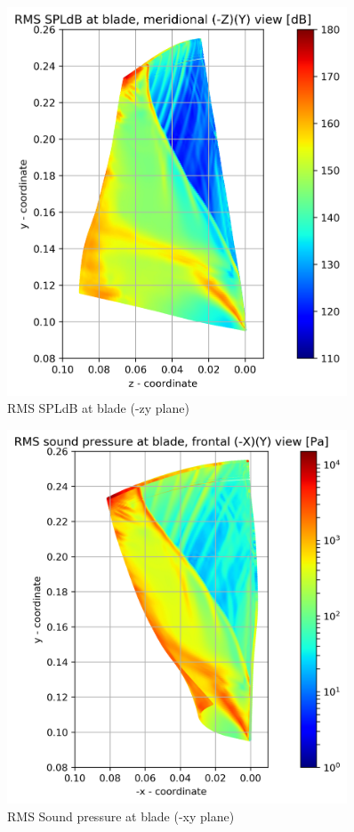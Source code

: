 \begin{figure}[ht]
	\centering
	\includegraphics[width=0.9\textwidth]{Figures/blade-negzy-rms-spldb.png}
	\caption{RMS SPLdB at blade (-zy plane)} \label{blade-negzy-rms-spldb}
\end{figure}

\begin{figure}[ht]
	\centering
	\includegraphics[width=0.9\textwidth]{Figures/blade-negxy-rms-spl.png}
   	\caption{RMS Sound pressure at blade (-xy plane)} \label{blade-negxy-rms-spl}
\end{figure}

